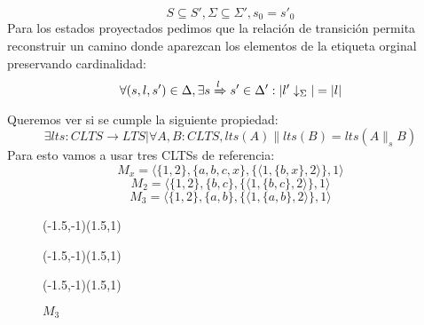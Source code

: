 \[S \subseteq S', \Sigma \subseteq \Sigma', s_0 = s'_0\]
Para los estados proyectados pedimos que la relación de transición permita reconstruir un camino donde aparezcan los elementos de la etiqueta orginal preservando cardinalidad:
\[ \forall (s,l,s') \in \Delta, \exists s \xRightarrow[]{l} s' \in \Delta': |l'\downarrow_{\Sigma}| = |l| \]
Queremos ver si se cumple la siguiente propiedad:
\[\exists lts: CLTS \rightarrow LTS | \forall A,B:CLTS, lts(A) \parallel lts(B) = lts(A \parallel_s B)\]
Para esto vamos a usar tres CLTSs de referencia:
\[M_x = \langle \lbrace 1,2 \rbrace, \lbrace a,b,c,x \rbrace, \lbrace\langle 1, \lbrace b,x \rbrace, 2 \rangle\rbrace, 1 \rangle\]
\[M_2 = \langle \lbrace 1,2 \rbrace, \lbrace b,c \rbrace, \lbrace \langle 1, \lbrace b,c \rbrace, 2 \rangle\rbrace, 1 \rangle\]
\[M_3 = \langle \lbrace 1,2 \rbrace, \lbrace a,b \rbrace, \lbrace \langle 1, \lbrace a,b \rbrace, 2 \rangle\rbrace, 1 \rangle\]
\begin{figure}[bt]
	\centering
{}%
\centering
\begin{VCPicture}{(-1.5,-1)(1.5,1)}
\end{VCPicture}
\caption{$M_x$}
\label{fig:m_x}
\endminipage\hfill
{}%
\centering
\begin{VCPicture}{(-1.5,-1)(1.5,1)}
\end{VCPicture}
\caption{$M_2$}
\label{fig:m_x}
\endminipage\hfill
{}%
\centering
\begin{VCPicture}{(-1.5,-1)(1.5,1)}
\end{VCPicture}
\caption{$M_3$}
\label{fig:m_x}
\endminipage\hfill
\end{figure}

